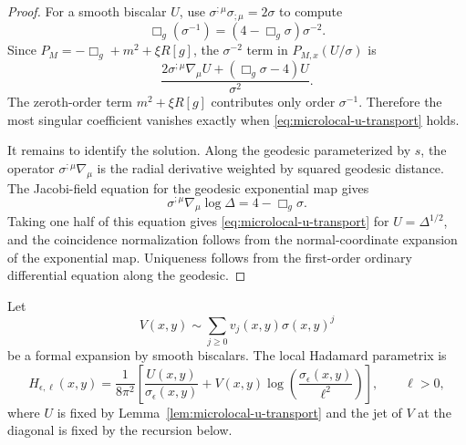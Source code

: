 \begin{proof}
For a smooth biscalar \(U\), use
\(\sigma^{;\mu}\sigma_{;\mu}=2\sigma\) to compute
\begin{equation}
  \Box_g(\sigma^{-1})=(4-\Box_g\sigma)\sigma^{-2}.
  \label{eq:microlocal-box-sigma-inverse}
\end{equation}
Since \(P_M=-\Box_g+m^2+\xi R[g]\), the \(\sigma^{-2}\) term in
\(P_{M,x}(U/\sigma)\) is
\begin{equation}
  \frac{
  2\sigma^{;\mu}\nabla_\mu U+(\Box_g\sigma-4)U
  }{\sigma^2}.
  \label{eq:microlocal-u-singular-coefficient}
\end{equation}
The zeroth-order term \(m^2+\xi R[g]\) contributes only order
\(\sigma^{-1}\).  Therefore the most singular coefficient vanishes exactly
when \eqref{eq:microlocal-u-transport} holds.

It remains to identify the solution.  Along the geodesic parameterized by
\(s\), the operator \(\sigma^{;\mu}\nabla_\mu\) is the radial derivative
weighted by squared geodesic distance.  The Jacobi-field equation for the
geodesic exponential map gives
\begin{equation}
  \sigma^{;\mu}\nabla_\mu\log\Delta
  =
  4-\Box_g\sigma .
  \label{eq:microlocal-delta-transport}
\end{equation}
Taking one half of this equation gives
\eqref{eq:microlocal-u-transport} for \(U=\Delta^{1/2}\), and the coincidence
normalization follows from the normal-coordinate expansion of the exponential
map.  Uniqueness follows from the first-order ordinary differential equation
along the geodesic.
\end{proof}

\begin{definition}
\label{def:microlocal-hadamard-parametrix}
Let
\begin{equation}
  V(x,y)\sim\sum_{j\geq0}v_j(x,y)\sigma(x,y)^j
  \label{eq:microlocal-v-expansion}
\end{equation}
be a formal expansion by smooth biscalars.  The local Hadamard parametrix is
\begin{equation}
  H_{\epsilon,\ell}(x,y)
  =
  \frac1{8\pi^2}
  \left[
    \frac{U(x,y)}{\sigma_\epsilon(x,y)}
    +
    V(x,y)\log\!\left(\frac{\sigma_\epsilon(x,y)}{\ell^2}\right)
  \right],
  \qquad \ell>0,
  \label{eq:microlocal-hadamard-parametrix}
\end{equation}
where \(U\) is fixed by Lemma~\ref{lem:microlocal-u-transport} and the
jet of \(V\) at the diagonal is fixed by the recursion below.
\end{definition}

